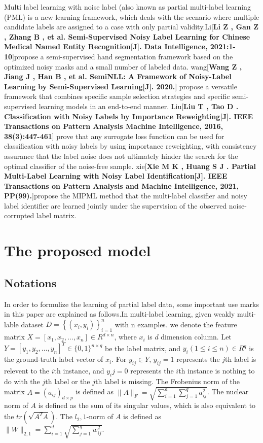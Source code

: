 \documentclass[final,3p,times]{elsarticle}
\begin{document}
Multi label learning with noise label (also known as partial multi-label learning (PML) is a new learning framework, which deals with the scenario where multiple candidate labels are assigned to a case with only partial validity.Li[\textbf{Li Z , Gan Z , Zhang B , et al. Semi-Supervised Noisy Label Learning for Chinese Medical Named Entity Recognition[J]. Data Intelligence, 2021:1-10}]propose a semi-supervised hand segmentation framework based on the optimized noisy masks and a small number of labeled data. wang[\textbf{Wang Z , Jiang J , Han B , et al. SemiNLL: A Framework of Noisy-Label Learning by Semi-Supervised Learning[J]. 2020.}] propose a versatile framework that combines specific sample selection strategies and specific semi-supervised learning models in an end-to-end manner. Liu[\textbf{Liu T , Tao D . Classification with Noisy Labels by Importance Reweighting[J]. IEEE Transactions on Pattern Analysis Machine Intelligence, 2016, 38(3):447-461}] prove that any surrogate loss function can be used for classification with noisy labels by using importance reweighting, with consistency assurance that the label noise does not ultimately hinder the search for the optimal classifier of the noise-free sample. xie[\textbf{Xie M K , Huang S J . Partial Multi-Label Learning with Noisy Label Identification[J]. IEEE Transactions on Pattern Analysis and Machine Intelligence, 2021, PP(99).}]propose the MIPML method that the multi-label classifier and noisy label identifier are learned jointly under the supervision of the observed noise-corrupted label matrix.










\section{The proposed model}
\subsection{Notations}
In order to formulize the learning of partial label data, some important use marks in this paper are explained as follows.In multi-label learning, given weakly multi-lable dataset $D=\left\{\left(x_{i},y_{i}\right)\right\}_{i=1}^{n}$ with n examples. we denote the feature matrix $X=\left[x_{1}, x_{2}, \ldots, x_{n}\right] \in R^{d \times n}$, where $x_{i}$ is $d$ dimension column. Let $Y=\left[y_{1}, y_{2}, \ldots, y_{n}\right]^{T} \in\{0,1\}^{n \times q}$ be the label matrix, and $y_{i}(1 \leq i \leq n) \in R^{q}$ is the ground-truth label vector of $x_{i}$. For $y_{ij} \in Y$, $y_{ij}=1$ represents the $j$th label is relevent to the $i$th instance, and $y_ij=0$ represents the $i$th instance is nothing to do with the $j$th label or the $j$th label is missing. The Frobenius norm of the matrix $A={(a_{ij})}_{d \times p}$ is defined as $\|A\|_{F}=\sqrt{\sum_{i=1}^{d} \sum_{j=1}^{q} a_{i j}^{2}}$. The nuclear norm of $A$ is defined as the sum of its singular values, which is also equivalent to the $tr\left(\sqrt{A^{T} A}\right)$. The $l_2,1$-norm of $A$ is defined as $\|W\|_{2,1}=\sum_{i=1}^{d} \sqrt{\sum_{j=1}^{q} w_{i j}^{2}}$. 
\end{document}
